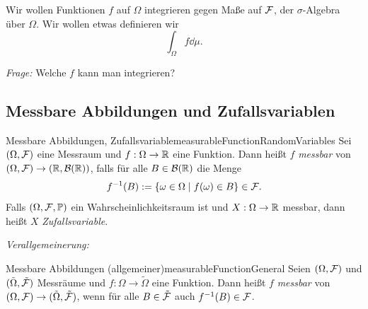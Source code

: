 \documentclass[language=ngerman]{../../Template/TemplateLecture}
\begin{document}
Wir wollen Funktionen $f$ auf $\Omega$ integrieren gegen Maße auf $\mathcal{F}$, der $\sigma$-Algebra über $\Omega$. Wir wollen etwas definieren wir 
\begin{equation}
    \int_\Omega f \dd\mu.
\end{equation}

\emph{Frage:} Welche $f$ kann man integrieren?

\subsection{Messbare Abbildungen und Zufallsvariablen}

\begin{defi}{Messbare Abbildungen, Zufallsvariable}{measurableFunctionRandomVariables}
    Sei $(\Omega, \mathcal{F})$ eine Messraum und $f: \Omega \to \mathbb{R}$ eine Funktion. Dann heißt $f$ \emph{messbar} von $(\Omega, \mathcal{F}) \to (\mathbb{R}, \mathcal{B}(\mathbb{R}))$, falls für alle $B \in \mathcal{B}(\mathbb{R})$ die Menge 
    \begin{equation}
        f^{-1}(B) := \{\omega \in \Omega \mid f(\omega) \in B\} \in \mathcal{F}.
    \end{equation}
    Falls $(\Omega, \mathcal{F}, \mathbb{P})$ ein Wahrscheinlichkeitsraum ist und $X: \Omega \to \mathbb{R}$ messbar, dann heißt $X$ \emph{Zufallsvariable}.
\end{defi}

\emph{Verallgemeinerung:}

\begin{defi}{Messbare Abbildungen (allgemeiner)}{measurableFunctionGeneral}
    Seien $(\Omega, \mathcal{F})$ und $(\tilde{\Omega}, \tilde{\mathcal{F}})$ Messräume und $f: \Omega \to \tilde{\Omega}$ eine Funktion. Dann heißt $f$ \emph{messbar} von $(\Omega, \mathcal{F}) \to (\tilde{\Omega}, \tilde{\mathcal{F}})$, wenn für alle $B \in \tilde{\mathcal{F}}$ auch $f^{-1}(B) \in \mathcal{F}$.
\end{defi}
\end{document}
